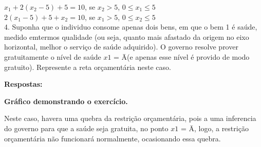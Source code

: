 \documentclass[a4paper, 12pt]{article} %
\begin{document}
\begin{flushleft}
{$x_{1}+2(x_{2}-5)+5=10$}, se {$x_{2}>5$}, {$0\leq$}{$x_{1}$}{$\leq5$}\\
{$2(x_{1}-5)+5+x_{2}=10$}, se {$x_{1}>5$}, {$0\leq$}{$x_{2}$}{$\leq5$}\\



4. Suponha que o individuo consome apenas dois bens, em que o bem 1 é saúde, medido emtermos qualidade (ou seja, quanto mais afastado da origem no eixo horizontal, melhor o serviço de saúde adquirido). O governo resolve prover gratuitamente o nível de saúde $\textit{x1}$ = Ā(e apenas esse nível é provido de modo gratuito). Represente a reta orçamentária neste caso. \singlespacing

\textbf{Respostas:} \singlespacing
\begin{center}
\textbf{Gráfico demonstrando o exercício.} 
\singlespacing
{}    
\singlespacing

\end{center}

Neste caso, havera uma quebra da restrição orçamentária, pois a uma inferencia do governo para que a saúde seja gratuita, no ponto $\textit{x1}$ = Ā, logo, a restrição orçamentária não funcionará normalmente, ocasionando essa quebra. \singlespacing


\end{flushleft}
\end{document}
